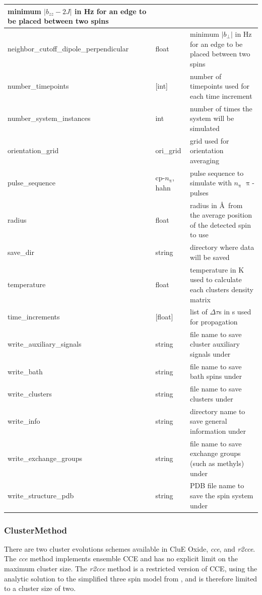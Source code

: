 \documentclass{book}
\begin{document}
\begin{center}
\begin{tabular}{| m{20em} | m{1.5cm}| m{7cm} |}
 minimum $|b_{zz}-2J|$ in Hz 
 for an edge to be placed between two spins\\
 \hline 
 neighbor\_cutoff\_dipole\_perpendicular & float & 
 minimum $|b_{\perp}|$ in Hz 
 for an edge to be placed between two spins\\
 \hline 
 number\_timepoints  & [int] & 
 number of timepoints used for each time increment\\ 
 \hline 
 number\_system\_instances  & int & 
 number of times the system will be simulated\\ 
 \hline 
 orientation\_grid  & ori\_grid & grid used for orientation averaging\\ 
 \hline 
 pulse\_sequence & cp-$n_{\uppi}$, hahn & 
 pulse sequence to simulate with $n_{\uppi}$ $\uppi$-pulses\\
 \hline 
 radius & float & 
 radius in \AA~from the average position of the detected spin to use\\
 \hline 
 save\_dir & string & 
 directory where data will be saved\\
 \hline 
 temperature & float & 
 temperature in K used to calculate each clusters density matrix\\
 \hline 
 time\_increments  & [float] & 
 list of $\Delta \tau$s in s used for propagation\\ 
 \hline 
 write\_auxiliary\_signals & string & 
 file name to save cluster auxiliary signals under\\
 \hline 
 write\_bath & string & 
 file name to save bath spins under\\
 \hline 
 write\_clusters & string & 
 file name to save clusters under\\
 \hline 
 write\_info & string & 
 directory name to save general information under\\
 \hline 
 write\_exchange\_groups & string & 
 file name to save exchange groups (such as methyls) under\\
 \hline 
 write\_structure\_pdb & string & 
 PDB file name to save the spin system under\\
 \hline 
\end{tabular}
\end{center} 
\subsubsection{ClusterMethod} %
There are two cluster evolutions schemes available in CluE Oxide, 
\textit{cce}, and \textit{r2cce}.
The \textit{cce} method implements ensemble CCE
\cite{2008_Yang_Liu,2009_Yang_Liu} and has no explicit limit on the maximum
cluster size.  
The \textit{r2cce} method is a restricted version of CCE, 
using the analytic solution to the simplified three spin model from
\cite{2006_Witzel_DasSarma}, and is therefore limited to a cluster size of two.
\end{document}

